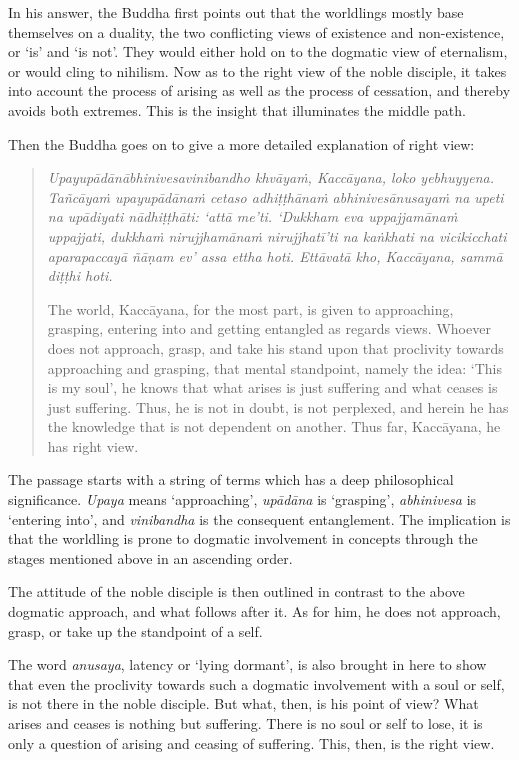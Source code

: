 In his answer, the Buddha first points out that the worldlings mostly base themselves on a duality, the two conflicting views of existence and non-existence, or `is' and `is not'. They would either hold on to the dogmatic view of eternalism, or would cling to nihilism. Now as to the right view of the noble disciple, it takes into account the process of arising as well as the process of cessation, and thereby avoids both extremes. This is the insight that illuminates the middle path.

Then the Buddha goes on to give a more detailed explanation of right view:

\begin{quote}
\emph{Upayupādānābhinivesavinibandho khvāyaṁ, Kaccāyana, loko yebhuyyena. Tañcāyaṁ upayupādānaṁ cetaso adhiṭṭhānaṁ abhinivesānusayaṁ na upeti na upādiyati nādhiṭṭhāti: `attā me'ti. `Dukkham eva uppajjamānaṁ uppajjati, dukkhaṁ nirujjhamānaṁ nirujjhatī'ti na kaṅkhati na vicikicchati aparapaccayā ñāṇam ev' assa ettha hoti. Ettāvatā kho, Kaccāyana, sammā diṭṭhi hoti.}

The world, Kaccāyana, for the most part, is given to approaching, grasping, entering into and getting entangled as regards views. Whoever does not approach, grasp, and take his stand upon that proclivity towards approaching and grasping, that mental standpoint, namely the idea: `This is my soul', he knows that what arises is just suffering and what ceases is just suffering. Thus, he is not in doubt, is not perplexed, and herein he has the knowledge that is not dependent on another. Thus far, Kaccāyana, he has right view.
\end{quote}

The passage starts with a string of terms which has a deep philosophical significance. \emph{Upaya} means `approaching', \emph{upādāna} is `grasping', \emph{abhinivesa} is `entering into', and \emph{vinibandha} is the consequent entanglement. The implication is that the worldling is prone to dogmatic involvement in concepts through the stages mentioned above in an ascending order.

The attitude of the noble disciple is then outlined in contrast to the above dogmatic approach, and what follows after it. As for him, he does not approach, grasp, or take up the standpoint of a self.

The word \emph{anusaya}, latency or `lying dormant', is also brought in here to show that even the proclivity towards such a dogmatic involvement with a soul or self, is not there in the noble disciple. But what, then, is his point of view? What arises and ceases is nothing but suffering. There is no soul or self to lose, it is only a question of arising and ceasing of suffering. This, then, is the right view.

